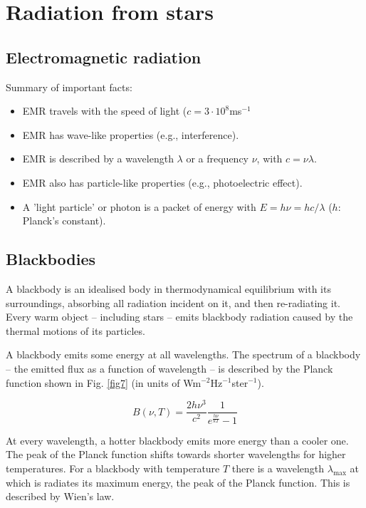 \section{Radiation from stars}

\subsection{Electromagnetic radiation}

Summary of important facts:
\begin{itemize}
\item{EMR travels with the speed of light ($c = 3\cdot10^8$ms$^{-1}$}
\item{EMR has wave-like properties (e.g., interference).}
\item{EMR is described by a wavelength $\lambda$ or a frequency $\nu$,
with $c = \nu\lambda$.}
\item{EMR also has particle-like properties (e.g., photoelectric effect).}
\item{A 'light particle' or photon is a packet of energy with $E = h \nu = h c / \lambda$ ($h$: Planck's constant).}
\end{itemize}

\subsection{Blackbodies}

A blackbody is an idealised body in thermodynamical equilibrium with its surroundings, absorbing all radiation incident on it, and then re-radiating it. Every warm object -- including stars -- emits blackbody radiation caused by the thermal motions of its particles.

A blackbody emits some energy at all wavelengths. The spectrum of a blackbody -- the emitted flux as a function of wavelength -- is described by the Planck function shown in Fig. \ref{fig7} (in units of Wm$^{-2}$Hz$^{-1}$ster$^{-1}$).

\begin{equation}
B(\nu,T) = \frac{2h\nu^3}{c^2} \frac{1}{e^{\frac{h\nu}{kT}} - 1}
\label{eq15}
\end{equation}

At every wavelength, a hotter blackbody emits more energy than a cooler one. The peak of the Planck function shifts towards shorter wavelengths for higher temperatures. For a blackbody with temperature $T$ there is a wavelength $\lambda_{\mathrm{max}}$ at which is radiates its maximum energy, the peak of the Planck function. This is described by Wien's law. 

